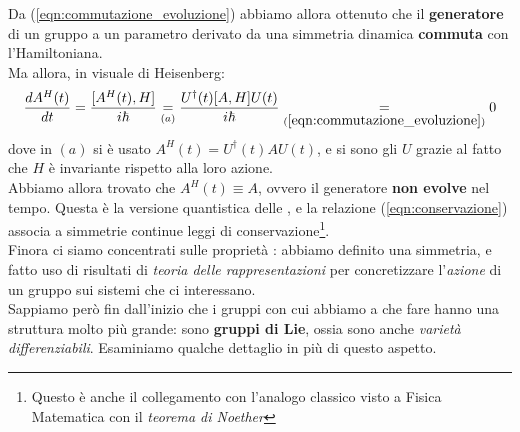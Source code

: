 \documentclass[../../FisicaTeorica.tex]{subfiles}
\begin{document}
Da (\ref{eqn:commutazione_evoluzione}) abbiamo allora ottenuto che il \textbf{generatore} di un gruppo a un parametro  derivato da una simmetria dinamica \textbf{commuta} con l'Hamiltoniana.\\
Ma allora, in visuale di Heisenberg:
\begin{equation}
\frac{dA^H(t)}{dt}=\frac{[A^H(t),H]}{i\hbar}\underset{(a)}{=}\frac{U^\dag(t)[A,H]U(t)}{i\hbar} \underset{(\ref{eqn:commutazione_evoluzione})}{=} 0
\label{eqn:conservazione}
\end{equation}
dove in $(a)$ si è usato $A^H(t)=U^\dag(t)AU(t)$, e si sono  gli $U$ grazie al fatto che $H$ è invariante rispetto alla loro azione.\\
Abbiamo allora trovato che $A^H(t) \equiv A$, ovvero il generatore \textbf{non evolve} nel tempo. Questa è la versione quantistica delle , e la relazione (\ref{eqn:conservazione}) associa a simmetrie continue leggi di conservazione\footnote{Questo è anche il collegamento con l'analogo classico visto a Fisica Matematica con il \textit{teorema di Noether}}.\\

Finora ci siamo concentrati sulle proprietà : abbiamo definito una simmetria, e fatto uso di risultati di \textit{teoria delle rappresentazioni} per concretizzare l'\textit{azione} di un gruppo sui sistemi che ci interessano.\\
Sappiamo però fin dall'inizio che i gruppi  con cui abbiamo a che fare hanno una struttura molto più grande: sono \textbf{gruppi di Lie}, ossia sono anche \textit{varietà differenziabili}. Esaminiamo qualche dettaglio in più di questo aspetto.\\
\end{document}
